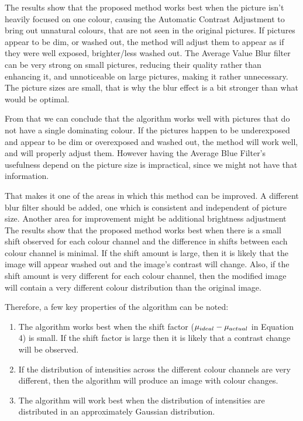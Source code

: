 \documentclass[journal,transmag]{IEEEtran}
\begin{document}
The results show that the proposed method works best when the picture isn't heavily focused on one colour, causing the Automatic Contrast Adjustment to bring out unnatural colours, that are not seen in the original pictures. If pictures appear to be dim, or washed out, the method will adjust them to appear as if they were well exposed, brighter/less washed out. 
The Average Value Blur filter can be very strong on small pictures, reducing their quality rather than enhancing it, and unnoticeable on large pictures, making it rather unnecessary. The picture sizes are small, that is why the blur effect is a bit stronger than what would be optimal.

From that we can conclude that the algorithm works well with pictures that do not have a single dominating colour. If the pictures happen to be underexposed and appear to be dim or overexposed and washed out, the method will work well, and will properly adjust them. However having the Average Blue Filter's usefulness depend on the picture size is impractical, since we might not have that information.

That makes it one of the areas in which this method can be improved. A different blur filter should be added, one which is consistent and independent of picture size. Another area for improvement might be additional brightness adjustment
The results show that the proposed method works best when there is a small shift observed for each colour channel and the difference in shifts between each colour channel is minimal.  If the shift amount is large, then it is likely that the image will appear washed out and the image's contrast will change.  Also, if the shift amount is very different for each colour channel, then the modified image will contain a very different colour distribution than the original image.   

Therefore, a few key properties of the algorithm can be noted:

\begin{enumerate}
\item The algorithm works best when the shift factor ($\mu_{\mbox{\tiny{ideal}}} - \mu_{\mbox{\tiny{actual}}}$ in Equation 4) is small.  If the shift factor is large then it is likely that a contrast change will be observed.
\item If the distribution of intensities across the different colour channels are very different, then the algorithm will produce an image with colour changes.
\item The algorithm will work best when the distribution of intensities are distributed in an approximately Gaussian distribution. 
\end{enumerate}
\end{document}
